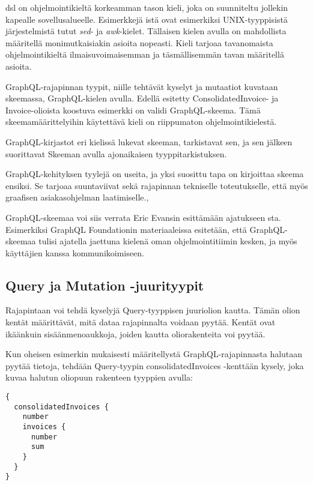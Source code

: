 \Gls{dsl} on ohjelmointikieltä korkeamman tason kieli, joka on
suunniteltu jollekin kapealle sovellusalueelle.\cite{landin1966next}
Esimerkkejä istä ovat esimerkiksi UNIX-tyyppisistä
järjestelmistä tutut \emph{sed}- ja \emph{awk}-kielet. Tällaisen kielen
avulla on mahdollista määritellä monimutkaisiakin asioita
nopeasti.\cite{Raymond2003} Kieli tarjoaa tavanomaista ohjelmointikieltä
ilmaisuvoimaisemman ja täsmällisemmän tavan määritellä asioita.

GraphQL-rajapinnan tyypit, niille tehtävät kyselyt ja mutaatiot kuvataan
skeemassa, GraphQL-kielen avulla. Edellä esitetty ConsolidatedInvoice-
ja Invoice-olioista koostuva esimerkki on validi GraphQL-skeema. Tämä
skeemamäärittelyihin käytettävä kieli on riippumaton
ohjelmointikielestä.

GraphQL-kirjastot eri kielissä lukevat skeeman, tarkistavat sen, ja sen
jälkeen suorittavat Skeeman avulla ajonaikaisen tyyppitarkistuksen.

GraphQL-kehityksen tyylejä on useita, ja yksi suosittu tapa on
kirjoittaa skeema ensiksi. Se tarjoaa suuntaviivat sekä rajapinnan
tekniselle toteutukselle, että myös graafisen asiakasohjelman
laatimiselle.\cite{SchemaDriven2017Nov},\cite{SchemaDrivenDesign2021Jul}

GraphQL-skeemaa voi siis verrata Eric Evansin esittämään ajatukseen
sta. Esimerkiksi GraphQL Foundationin
materiaaleissa esitetään, että GraphQL-skeemaa tulisi ajatella jaettuna
kielenä oman ohjelmointitiimin kesken, ja myös käyttäjien kanssa
kommunikoimiseen.\cite{thinkingInGraphsOct2021}

\hypertarget{query-ja-mutation--juurityypit}{%
\subsection{Query ja Mutation
-juurityypit}\label{query-ja-mutation--juurityypit}}

Rajapintaan voi tehdä kyselyjä Query-tyyppisen juuriolion kautta. Tämän
olion kentät määrittävät, mitä dataa rajapinnalta voidaan pyytää. Kentät
ovat ikäänkuin sisäänmenoaukkoja, joiden kautta oliorakenteita voi
pyytää.

Kun oheisen esimerkin mukaisesti määritellystä GraphQL-rajapinnasta
halutaan pyytää tietoja, tehdään Query-tyypin consolidatedInvoices
-kenttään kysely, joka kuvaa halutun oliopuun rakenteen tyyppien avulla:

\begin{verbatim}
{
  consolidatedInvoices {
    number
    invoices {
      number
      sum
    }
  }
}
\end{verbatim}


